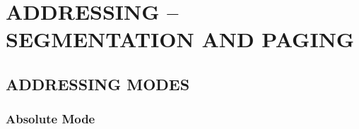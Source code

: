 
\section{ADDRESSING -- SEGMENTATION AND PAGING}
\label {s5}

\subsection{ADDRESSING MODES}


\subsubsection{Absolute Mode}

